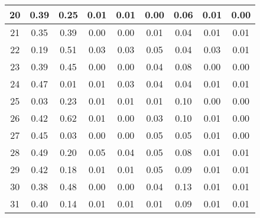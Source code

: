 \begin{table}[h!]
\begin{tabular}{|c|c|c|c|c|c|c|c|c|}
20           & 0.39 & 0.25 & 0.01 & 0.01 & 0.00 & 0.06 & 0.01  & 0.00  \\ \hline
21           & 0.35 & 0.39 & 0.00 & 0.00 & 0.01 & 0.04 & 0.01  & 0.01  \\ \hline
22           & 0.19 & 0.51 & 0.03 & 0.03 & 0.05 & 0.04 & 0.03  & 0.01  \\ \hline
23           & 0.39 & 0.45 & 0.00 & 0.00 & 0.04 & 0.08 & 0.00  & 0.00  \\ \hline
24           & 0.47 & 0.01 & 0.01 & 0.03 & 0.04 & 0.04 & 0.01  & 0.01  \\ \hline
25           & 0.03 & 0.23 & 0.01 & 0.01 & 0.01 & 0.10 & 0.00  & 0.00  \\ \hline
26           & 0.42 & 0.62 & 0.01 & 0.00 & 0.03 & 0.10 & 0.01  & 0.00  \\ \hline
27           & 0.45 & 0.03 & 0.00 & 0.00 & 0.05 & 0.05 & 0.01  & 0.00  \\ \hline
28           & 0.49 & 0.20 & 0.05 & 0.04 & 0.05 & 0.08 & 0.01  & 0.01  \\ \hline
29           & 0.42 & 0.18 & 0.01 & 0.01 & 0.05 & 0.09 & 0.01  & 0.01  \\ \hline
30           & 0.38 & 0.48 & 0.00 & 0.00 & 0.04 & 0.13 & 0.01  & 0.01  \\ \hline
31           & 0.40 & 0.14 & 0.01 & 0.01 & 0.01 & 0.09 & 0.01  & 0.01  \\ \hline
\end{tabular}
\end{table}


